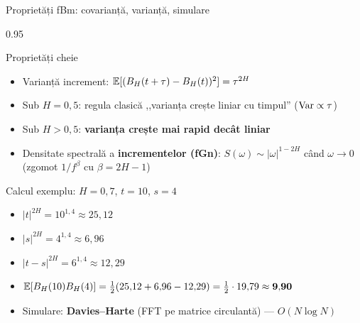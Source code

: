 \documentclass[9pt, aspectratio=169, t]{beamer}
\begin{document}
\begin{frame}[shrink=15]{Proprietăți fBm: covarianță, varianță, simulare}
\begin{cminipage}{0.95\textwidth}
\begin{block}{Proprietăți cheie}
\begin{itemize}\setlength{\itemsep}{0pt}
    \item Varianță increment: $\mathbb{E}[(B_H(t+\tau)-B_H(t))^2]=\tau^{2H}$
    \item Sub $H=0{,}5$: regula clasică ,,varianța crește liniar cu timpul'' ($\text{Var}\propto\tau$)
    \item Sub $H>0{,}5$: \textbf{varianța crește mai rapid decât liniar}
    \item Densitate spectrală a \textbf{incrementelor (fGn)}: $S(\omega)\sim |\omega|^{1-2H}$ când $\omega\to 0$ (zgomot $1/f^{\beta}$ cu $\beta=2H-1$)
\end{itemize}
\end{block}
\begin{exampleblock}{Calcul exemplu: $H=0{,}7$, $t=10$, $s=4$}
\begin{itemize}\setlength{\itemsep}{0pt}
    \item $|t|^{2H}=10^{1{,}4}\approx 25{,}12$
    \item $|s|^{2H}=4^{1{,}4}\approx 6{,}96$
    \item $|t-s|^{2H}=6^{1{,}4}\approx 12{,}29$
    \item $\mathbb{E}[B_H(10)B_H(4)]=\tfrac12(25{,}12+6{,}96-12{,}29)=\tfrac12\cdot 19{,}79\approx \mathbf{9{,}90}$
\end{itemize}
\end{exampleblock}
\begin{itemize}\setlength{\itemsep}{0pt}
    \item Simulare: \textbf{Davies--Harte} (FFT pe matrice circulantă) --- $O(N\log N)$
\end{itemize}
\end{cminipage}
\end{frame}
\end{document}
